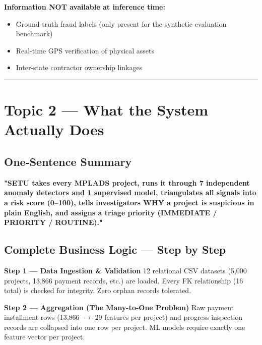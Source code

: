 \documentclass[11pt,a4paper]{article}
\begin{document}
\textbf{Information NOT available at inference time:}
\begin{itemize}[leftmargin=1.5em, itemsep=2pt, topsep=3pt]
\item Ground-truth fraud labels (only present for the synthetic evaluation benchmark)
\item Real-time GPS verification of physical assets
\item Inter-state contractor ownership linkages
\end{itemize}

\vspace{1em}\hrule\vspace{1em}

\section{Topic 2 --- What the System Actually Does}

\subsection{One-Sentence Summary}

\begin{tcolorbox}[colback=blue!4!white,colframe=blue!60!black,arc=1.5mm,boxrule=0.7pt,left=8pt,right=8pt,top=6pt,bottom=6pt]
\textbf{"SETU takes every MPLADS project, runs it through 7 independent anomaly detectors and 1 supervised model, triangulates all signals into a risk score (0–100), tells investigators WHY a project is suspicious in plain English, and assigns a triage priority (IMMEDIATE / PRIORITY / ROUTINE)."}\\
\end{tcolorbox}

\subsection{Complete Business Logic --- Step by Step}

\textbf{Step 1 --- Data Ingestion \& Validation}
12 relational CSV datasets (5,000 projects, 13,866 payment records, etc.) are loaded. Every FK relationship (16 total) is checked for integrity. Zero orphan records tolerated.

\textbf{Step 2 --- Aggregation (The Many-to-One Problem)}
Raw payment installment rows (13,866 $\rightarrow$ 29 features per project) and progress inspection records are collapsed into one row per project. ML models require exactly one feature vector per project.
\end{document}
